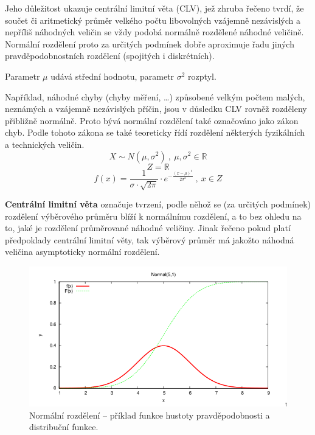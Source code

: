 \begin{compactitem}
    \item Jeho důležitost ukazuje centrální limitní věta (CLV), jež zhruba řečeno tvrdí, že součet či aritmetický průměr velkého počtu libovolných vzájemně nezávislých a nepříliš  náhodných veličin se vždy podobá normálně rozdělené náhodné veličině. Normální rozdělení proto za určitých podmínek dobře aproximuje řadu jiných pravděpodobnostních rozdělení (spojitých i diskrétních).

    \item Parametr $\mu$ udává střední hodnotu, parametr $\sigma^2$ rozptyl.

    \item Například, náhodné chyby (chyby měření, \dots) způsobené velkým počtem malých, neznámých a vzájemně nezávislých příčin, jsou v důsledku CLV rovněž rozděleny přibližně normálně. Proto bývá normální rozdělení také označováno jako zákon chyb. Podle tohoto zákona se také teoreticky řídí rozdělení některých fyzikálních a technických veličin.
    $$ X \sim N(\mu, \sigma^2) ~,~ \mu, \sigma^2 \in \mathbb{R} $$
    $$ Z = \mathbb{R} $$
    $$ f(x) = \frac{1}{\sigma \cdot \sqrt{2 \pi}} \cdot e^{- \frac{(x-\mu)^2}{2 \sigma^2}} ~,~ x \in Z
    $$

    \item \textbf{Centrální limitní věta} označuje tvrzení, podle něhož se (za určitých podmínek) rozdělení výběrového průměru blíží k normálnímu rozdělení, a to bez ohledu na to, jaké je rozdělení průměrované náhodné veličiny. Jinak řečeno pokud platí předpoklady centrální limitní věty, tak výběrový průměr má jakožto náhodná veličina asymptoticky normální rozdělení.
\end{compactitem}

\begin{figure}[H]
    \centering
    \includegraphics[width=1\linewidth]{snp_normalni.png}
    \caption{Normální rozdělení -- příklad funkce hustoty pravděpodobnosti a distribuční funkce.}
\end{figure}

